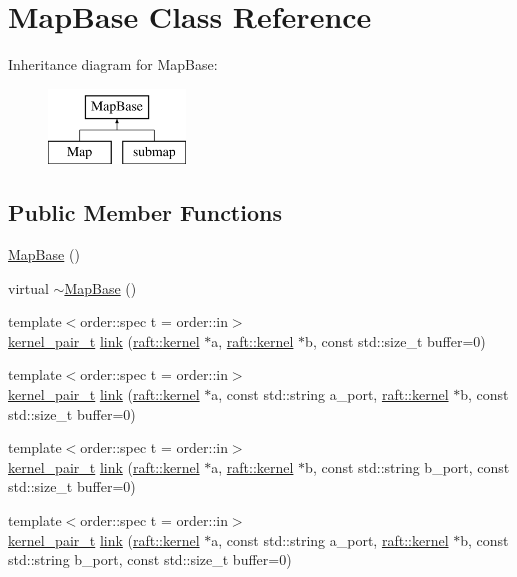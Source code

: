 \hypertarget{class_map_base}{}\section{Map\+Base Class Reference}
\label{class_map_base}
Inheritance diagram for Map\+Base\+:\begin{figure}[H]
\begin{center}
\leavevmode
\includegraphics[height=2.000000cm]{class_map_base}
\end{center}
\end{figure}
\subsection*{Public Member Functions}
\begin{DoxyCompactItemize}
\item 
\hyperlink{class_map_base_a5a923d5b3ececb0407aa934d967ab7b1}{Map\+Base} ()
\item 
virtual \hyperlink{class_map_base_a6c62d788746d2161264b84ba66efcfbe}{$\sim$\+Map\+Base} ()
\item 
{\footnotesize template$<$order\+::spec t = order\+::in$>$ }\\\hyperlink{classkernel__pair__t}{kernel\+\_\+pair\+\_\+t} \hyperlink{class_map_base_ad98ef02c1651130ad6b565ad156b97c1}{link} (\hyperlink{classraft_1_1kernel}{raft\+::kernel} $\ast$a, \hyperlink{classraft_1_1kernel}{raft\+::kernel} $\ast$b, const std\+::size\+\_\+t buffer=0)
\item 
{\footnotesize template$<$order\+::spec t = order\+::in$>$ }\\\hyperlink{classkernel__pair__t}{kernel\+\_\+pair\+\_\+t} \hyperlink{class_map_base_ad982ebf61439a069ed36dc5f756b732a}{link} (\hyperlink{classraft_1_1kernel}{raft\+::kernel} $\ast$a, const std\+::string a\+\_\+port, \hyperlink{classraft_1_1kernel}{raft\+::kernel} $\ast$b, const std\+::size\+\_\+t buffer=0)
\item 
{\footnotesize template$<$order\+::spec t = order\+::in$>$ }\\\hyperlink{classkernel__pair__t}{kernel\+\_\+pair\+\_\+t} \hyperlink{class_map_base_a19a0a2f6842a863327920776457c52bf}{link} (\hyperlink{classraft_1_1kernel}{raft\+::kernel} $\ast$a, \hyperlink{classraft_1_1kernel}{raft\+::kernel} $\ast$b, const std\+::string b\+\_\+port, const std\+::size\+\_\+t buffer=0)
\item 
{\footnotesize template$<$order\+::spec t = order\+::in$>$ }\\\hyperlink{classkernel__pair__t}{kernel\+\_\+pair\+\_\+t} \hyperlink{class_map_base_af06481b99a96e3c5ae8da88cc8a78e91}{link} (\hyperlink{classraft_1_1kernel}{raft\+::kernel} $\ast$a, const std\+::string a\+\_\+port, \hyperlink{classraft_1_1kernel}{raft\+::kernel} $\ast$b, const std\+::string b\+\_\+port, const std\+::size\+\_\+t buffer=0)
\end{DoxyCompactItemize}

